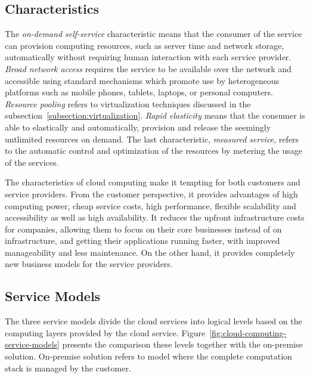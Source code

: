 \subsection{Characteristics}
The \emph{on-demand self-service} characteristic means that the consumer of the service can provision computing resources, such as server time and network storage, automatically without requiring human interaction with each service provider. \emph{Broad network access} requires the service to be available over the network and accessible using standard mechanisms which promote use by heterogeneous platforms such as mobile phones, tablets, laptops, or personal computers. \emph{Resource pooling} refers to virtualization techniques discussed in the subsection~\ref{subsection:virtualization}. \emph{Rapid elasticity} means that the consumer is able to elastically and automatically, provision and release the seemingly untlimited resources on demand. The last characteristic, \emph{measured service}, refers to the automatic control and optimization of the resources by metering the usage of the services.~\cite{Mell:2011:ccdef}

The characteristics of cloud computing make it tempting for both customers and service providers. From the customer perspective, it provides advantages of high computing power, cheap service costs, high performance, flexible scalability and accessibility as well as high availability. It reduces the upfront infrastructure costs for companies, allowing them to focus on their core businesses instead of on infrastructure, and getting their applications running faster, with improved manageability and less maintenance. On the other hand, it provides completely new business models for the service providers.~\cite{Mell:2011:ccdef, Dikaiakos:2009:Cloud}

\subsection{Service Models}
The three service models divide the cloud services into logical levels based on the computing layers provided by the cloud service. Figure~\ref{fig:cloud-computing-service-models} presents the comparison these levels together with the on-premise solution. On-premise solution refers to model where the complete computation stack is managed by the customer.

